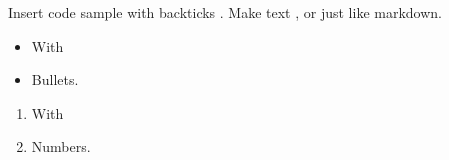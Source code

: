 \documentclass[letterpaper,10pt,english]{sphinxmanual}
\begin{document}
\sphinxAtStartPar
Insert code sample with backticks .
Make text , or  just like markdown.
\begin{description}
\begin{itemize}
\item {} 
\sphinxAtStartPar
With

\item {} 
\sphinxAtStartPar
Bullets.

\end{itemize}

\begin{enumerate}
%
\item {} 
\sphinxAtStartPar
With

\item {} 
\sphinxAtStartPar
Numbers.

\end{enumerate}

\end{description}
\end{document}
